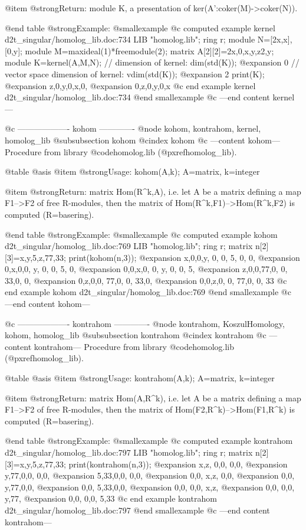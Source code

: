 @item @strong{Return:}
module K, a presentation of ker(A':coker(M)->coker(N)).

@end table
@strong{Example:}
@smallexample
@c computed example kernel d2t_singular/homolog_lib.doc:734 
LIB "homolog.lib";
ring r;
module N=[2x,x],[0,y];
module M=maxideal(1)*freemodule(2);
matrix A[2][2]=2x,0,x,y,z2,y;
module K=kernel(A,M,N);
// dimension of kernel:  
dim(std(K));
@expansion{} 0
// vector space dimension of kernel: 
vdim(std(K));
@expansion{} 2
print(K);
@expansion{} z,0,y,0,x,0,
@expansion{} 0,z,0,y,0,x 
@c end example kernel d2t_singular/homolog_lib.doc:734
@end smallexample
@c ---end content kernel---

@c ------------------- kohom -------------
@node kohom, kontrahom, kernel, homolog_lib
@subsubsection kohom
@cindex kohom
@c ---content kohom---
Procedure from library @code{homolog.lib} (@pxref{homolog_lib}).

@table @asis
@item @strong{Usage:}
kohom(A,k); A=matrix, k=integer

@item @strong{Return:}
matrix Hom(R^k,A), i.e. let A be a matrix defining a map F1-->F2
of free R-modules, then the matrix of Hom(R^k,F1)-->Hom(R^k,F2)
is computed (R=basering).

@end table
@strong{Example:}
@smallexample
@c computed example kohom d2t_singular/homolog_lib.doc:769 
LIB "homolog.lib";
ring r;
matrix n[2][3]=x,y,5,z,77,33;
print(kohom(n,3));
@expansion{} x,0,0,y, 0, 0, 5, 0, 0,
@expansion{} 0,x,0,0, y, 0, 0, 5, 0,
@expansion{} 0,0,x,0, 0, y, 0, 0, 5,
@expansion{} z,0,0,77,0, 0, 33,0, 0,
@expansion{} 0,z,0,0, 77,0, 0, 33,0,
@expansion{} 0,0,z,0, 0, 77,0, 0, 33
@c end example kohom d2t_singular/homolog_lib.doc:769
@end smallexample
@c ---end content kohom---

@c ------------------- kontrahom -------------
@node kontrahom, KoszulHomology, kohom, homolog_lib
@subsubsection kontrahom
@cindex kontrahom
@c ---content kontrahom---
Procedure from library @code{homolog.lib} (@pxref{homolog_lib}).

@table @asis
@item @strong{Usage:}
kontrahom(A,k); A=matrix, k=integer

@item @strong{Return:}
matrix Hom(A,R^k), i.e. let A be a matrix defining a map F1-->F2 of
free R-modules, then the matrix of Hom(F2,R^k)-->Hom(F1,R^k) is
computed (R=basering).

@end table
@strong{Example:}
@smallexample
@c computed example kontrahom d2t_singular/homolog_lib.doc:797 
LIB "homolog.lib";
ring r;
matrix n[2][3]=x,y,5,z,77,33;
print(kontrahom(n,3));
@expansion{} x,z, 0,0, 0,0, 
@expansion{} y,77,0,0, 0,0, 
@expansion{} 5,33,0,0, 0,0, 
@expansion{} 0,0, x,z, 0,0, 
@expansion{} 0,0, y,77,0,0, 
@expansion{} 0,0, 5,33,0,0, 
@expansion{} 0,0, 0,0, x,z, 
@expansion{} 0,0, 0,0, y,77,
@expansion{} 0,0, 0,0, 5,33 
@c end example kontrahom d2t_singular/homolog_lib.doc:797
@end smallexample
@c ---end content kontrahom---

